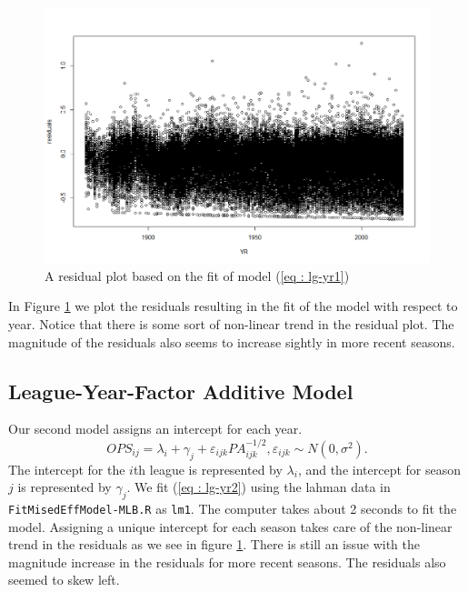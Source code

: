 \documentclass [52pt] {article}
\begin{document}
\begin{figure}[h!]
\centering
\includegraphics[scale = 0.5]{lg-yr_add-res1.png}
\caption{\label{fig : lg-yr1res} A residual plot based on the fit of model (\ref{eq : lg-yr1})}
\end{figure}
In Figure \ref{fig : lg-yr1res} we plot the residuals resulting in the fit of the model with respect to year.  Notice that there is some sort of non-linear trend in the residual plot.  The magnitude of the residuals also seems to increase sightly in more recent seasons.

\subsection{League-Year-Factor Additive Model}
Our second model assigns an intercept for each year.  
\begin{equation}\label{eq : lg-yr2}
OPS_{ij} = \lambda_i + \gamma_j + \varepsilon_{ijk} PA_{ijk}^{-1/2}, \varepsilon_{ijk}\sim N(0,\sigma^2).
\end{equation}
The intercept for the $i$th league is represented by $\lambda_i$, and the intercept for season $j$ is represented by $\gamma_j$.  We fit (\ref{eq : lg-yr2}) using the lahman data in \verb|FitMisedEffModel-MLB.R| as \verb|lm1|.  The computer takes about 2 seconds to fit the model.  Assigning a unique intercept for each season takes care of the non-linear trend in the residuals as we see in figure \ref{fig : lg-yr1res}.  There is still an issue with the magnitude increase in the residuals for more recent seasons.  The residuals also seemed to skew left.
\end{document}
